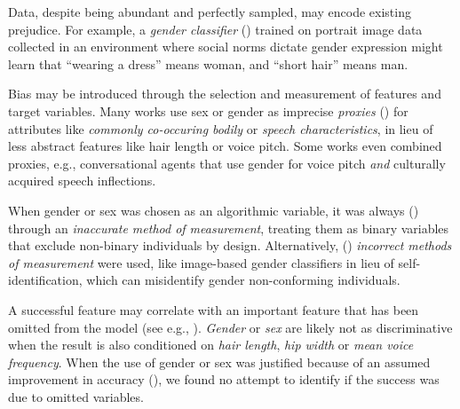 \documentclass[sigconf,balance=false]{acmart}
\begin{document}
 Data, despite being abundant and perfectly sampled, may encode existing prejudice. For example, a \emph{gender classifier} (\classifier) trained on portrait image data collected in an environment where social norms dictate gender expression might learn that ``wearing a dress'' means woman, and ``short hair'' means man.

 Bias may be introduced through the selection and measurement of features and target variables.
Many works use sex or gender as imprecise \emph{proxies} (\var) for attributes like \emph{commonly co-occuring bodily} or \emph{speech characteristics}, in lieu of less abstract features like hair length or voice pitch. Some works even combined proxies, e.g., conversational agents that use gender for voice pitch \emph{and} culturally acquired speech inflections.

When gender or sex was chosen as an algorithmic variable, it was always (\binary) through an \emph{inaccurate method of measurement}, treating them as binary variables that exclude non-binary individuals by design. Alternatively, (\classifier) \emph{incorrect methods of measurement} were used, like image-based gender classifiers in lieu of self-identification, which can misidentify gender non-conforming individuals.

 A successful feature may correlate with an important feature that has been omitted from the model (see e.g., \cite{clarke2005phantom}). \emph{Gender} or \emph{sex} are likely not as discriminative when the result is also conditioned on \emph{hair length}, \emph{hip width} or \emph{mean voice frequency}. When the use of gender or sex was justified because of an assumed improvement in accuracy (\var), we found no attempt to identify if the success was due to omitted variables.
\end{document}
